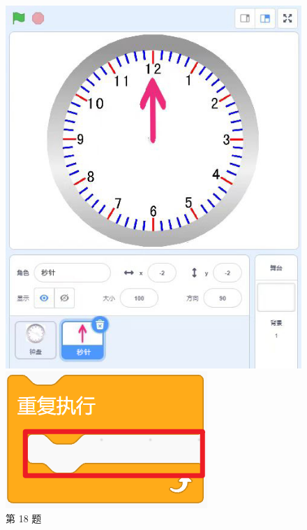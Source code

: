 \documentclass[10pt, a4paper]{article}
\begin{document}
\begin{enumerate}
        \begin{figure}[htbp]
            \centering
            \begin{minipage}[t]{.15\textwidth}
                \centering
                \includegraphics[width=\textwidth]{18.jpg}
                \caption*{第 18 题}
            \end{minipage}
            \begin{minipage}[t]{.15\textwidth}
                \centering
                \includegraphics[width=\textwidth]{21.png}

\end{minipage}
\end{figure}
\end{enumerate}
\end{document}
